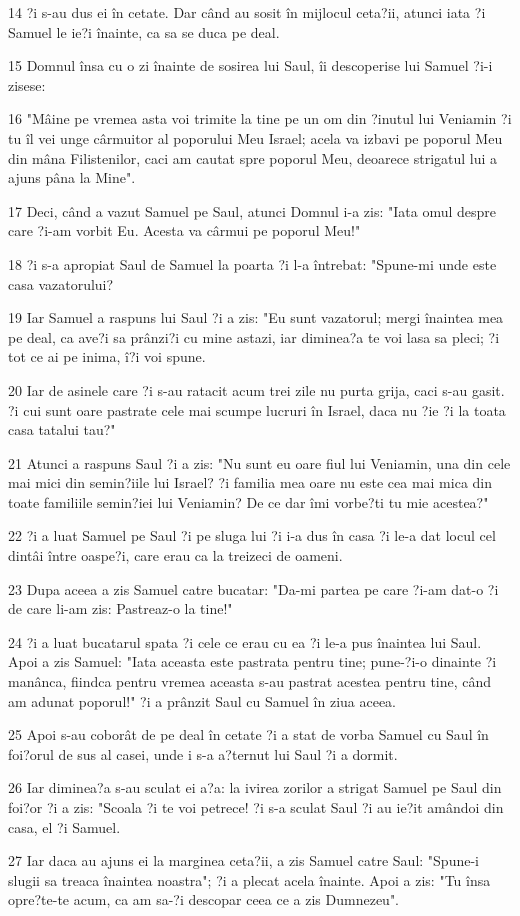 \par 14 ?i s-au dus ei în cetate. Dar când au sosit în mijlocul ceta?ii, atunci iata ?i Samuel le ie?i înainte, ca sa se duca pe deal.
\par 15 Domnul însa cu o zi înainte de sosirea lui Saul, îi descoperise lui Samuel ?i-i zisese:
\par 16 "Mâine pe vremea asta voi trimite la tine pe un om din ?inutul lui Veniamin ?i tu îl vei unge cârmuitor al poporului Meu Israel; acela va izbavi pe poporul Meu din mâna Filistenilor, caci am cautat spre poporul Meu, deoarece strigatul lui a ajuns pâna la Mine".
\par 17 Deci, când a vazut Samuel pe Saul, atunci Domnul i-a zis: "Iata omul despre care ?i-am vorbit Eu. Acesta va cârmui pe poporul Meu!"
\par 18 ?i s-a apropiat Saul de Samuel la poarta ?i l-a întrebat: "Spune-mi unde este casa vazatorului?
\par 19 Iar Samuel a raspuns lui Saul ?i a zis: "Eu sunt vazatorul; mergi înaintea mea pe deal, ca ave?i sa prânzi?i cu mine astazi, iar diminea?a te voi lasa sa pleci; ?i tot ce ai pe inima, î?i voi spune.
\par 20 Iar de asinele care ?i s-au ratacit acum trei zile nu purta grija, caci s-au gasit. ?i cui sunt oare pastrate cele mai scumpe lucruri în Israel, daca nu ?ie ?i la toata casa tatalui tau?"
\par 21 Atunci a raspuns Saul ?i a zis: "Nu sunt eu oare fiul lui Veniamin, una din cele mai mici din semin?iile lui Israel? ?i familia mea oare nu este cea mai mica din toate familiile semin?iei lui Veniamin? De ce dar îmi vorbe?ti tu mie acestea?"
\par 22 ?i a luat Samuel pe Saul ?i pe sluga lui ?i i-a dus în casa ?i le-a dat locul cel dintâi între oaspe?i, care erau ca la treizeci de oameni.
\par 23 Dupa aceea a zis Samuel catre bucatar: "Da-mi partea pe care ?i-am dat-o ?i de care li-am zis: Pastreaz-o la tine!"
\par 24 ?i a luat bucatarul spata ?i cele ce erau cu ea ?i le-a pus înaintea lui Saul. Apoi a zis Samuel: "Iata aceasta este pastrata pentru tine; pune-?i-o dinainte ?i manânca, fiindca pentru vremea aceasta s-au pastrat acestea pentru tine, când am adunat poporul!" ?i a prânzit Saul cu Samuel în ziua aceea.
\par 25 Apoi s-au coborât de pe deal în cetate ?i a stat de vorba Samuel cu Saul în foi?orul de sus al casei, unde i s-a a?ternut lui Saul ?i a dormit.
\par 26 Iar diminea?a s-au sculat ei a?a: la ivirea zorilor a strigat Samuel pe Saul din foi?or ?i a zis: "Scoala ?i te voi petrece! ?i s-a sculat Saul ?i au ie?it amândoi din casa, el ?i Samuel.
\par 27 Iar daca au ajuns ei la marginea ceta?ii, a zis Samuel catre Saul: "Spune-i slugii sa treaca înaintea noastra"; ?i a plecat acela înainte. Apoi a zis: "Tu însa opre?te-te acum, ca am sa-?i descopar ceea ce a zis Dumnezeu".

